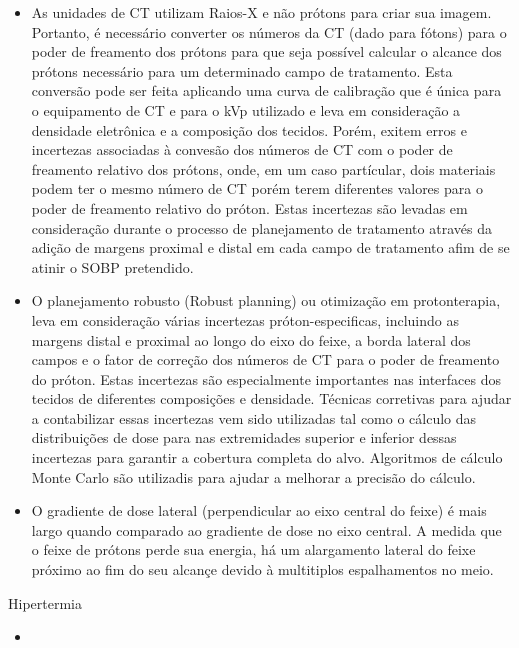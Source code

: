 \documentclass[11pt,a4paper]{article}
\newcounter{exemplo}
\begin{document}
\begin{exemplo}
\begin{itemize}
        \item As unidades de CT utilizam Raios-X e não prótons para criar sua imagem. Portanto, é necessário converter os números da CT (dado para fótons) para o poder de freamento dos prótons para que seja possível calcular o alcance dos prótons necessário para um determinado campo de tratamento. Esta conversão pode ser feita aplicando uma curva de calibração que é única para o equipamento de CT e para o kVp utilizado e leva em consideração a densidade eletrônica e a composição dos tecidos. Porém, exitem erros e incertezas associadas à convesão dos números de CT com o poder de freamento relativo dos prótons, onde, em um caso partícular, dois materiais podem ter o mesmo número de CT porém terem diferentes valores para o poder de freamento relativo do próton. Estas incertezas são levadas em consideração durante o processo de planejamento de tratamento através da adição de margens proximal e distal em cada campo de tratamento afim de se atinir o SOBP pretendido.
        
        \item O planejamento robusto (Robust planning) ou otimização em protonterapia, leva em consideração várias incertezas próton-especificas, incluindo as margens distal e proximal ao longo do eixo do feixe, a borda lateral dos campos e o fator de correção dos números de CT para o poder de freamento do próton. Estas incertezas são especialmente importantes nas interfaces dos tecidos de diferentes composições e densidade. Técnicas corretivas para ajudar a contabilizar essas incertezas vem sido utilizadas tal como o cálculo das distribuições de dose para nas extremidades superior e inferior dessas incertezas para garantir a cobertura completa do alvo. Algoritmos de cálculo Monte Carlo são utilizadis para ajudar a melhorar a precisão do cálculo.
        
        \item O gradiente de dose lateral (perpendicular ao  eixo central do feixe) é mais largo quando comparado ao gradiente de dose no eixo central. A medida que o feixe de prótons perde sua energia, há um alargamento lateral do feixe próximo ao fim do seu alcançe devido à multitiplos espalhamentos no meio.

    \end{itemize}

    \textcolor{CarnationPink}{Hipertermia}
    \begin{itemize}
        \item 
    \end{itemize}

\end{exemplo}
\end{document}
